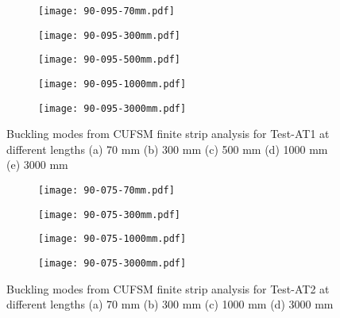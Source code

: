 \begin{figure}
	\centering
	\begin{subfigure}[b]{0.15\textwidth}
		\centering
		\texttt{[image: 90-095-70mm.pdf]}
		\caption{}
		\label{subfig:90-095-70mm}
	\end{subfigure}
	\begin{subfigure}[b]{0.15\textwidth}
		\centering
		\texttt{[image: 90-095-300mm.pdf]}
		\caption{}
		\label{subfig:90-095-300mm}
	\end{subfigure}
	\begin{subfigure}[b]{0.15\textwidth}
		\centering
		\texttt{[image: 90-095-500mm.pdf]}
		\caption{}
		\label{subfig:90-095-500mm}
	\end{subfigure}
	\begin{subfigure}[b]{0.18\textwidth}
		\centering
		\texttt{[image: 90-095-1000mm.pdf]}
		\caption{}
		\label{subfig:90-095-1000mm}
	\end{subfigure}
	\begin{subfigure}[b]{0.18\textwidth}
		\centering
		\texttt{[image: 90-095-3000mm.pdf]}
		\caption{}
		\label{subfig:90-095-3000mm}
	\end{subfigure}
		\caption{Buckling modes from CUFSM finite strip analysis for Test-AT1 at different lengths (a) 70 mm (b) 300 mm (c) 500 mm (d) 1000 mm (e) 3000 mm}
		\label{fig:90-095-CUFSM-buckling}
\end{figure}
\begin{figure}
	\centering
	\begin{subfigure}[b]{0.15\textwidth}
		\centering
		\texttt{[image: 90-075-70mm.pdf]}
		\caption{}
		\label{subfig:90-075-70mm}
	\end{subfigure}
	\begin{subfigure}[b]{0.18\textwidth}
		\centering
		\texttt{[image: 90-075-300mm.pdf]}
		\caption{}
		\label{subfig:90-075-300mm}
	\end{subfigure}
	\begin{subfigure}[b]{0.18\textwidth}
		\centering
		\texttt{[image: 90-075-1000mm.pdf]}
		\caption{}
		\label{subfig:90-075-1000mm}
	\end{subfigure}
	\begin{subfigure}[b]{0.18\textwidth}
		\centering
		\texttt{[image: 90-075-3000mm.pdf]}
		\caption{}
		\label{subfig:90-075-3000mm}
	\end{subfigure}
		\caption{Buckling modes from CUFSM finite strip analysis for Test-AT2 at different lengths (a) 70 mm (b) 300 mm (c) 1000 mm (d) 3000 mm}
		\label{fig:90-075-CUFSM-buckling}
\end{figure}

